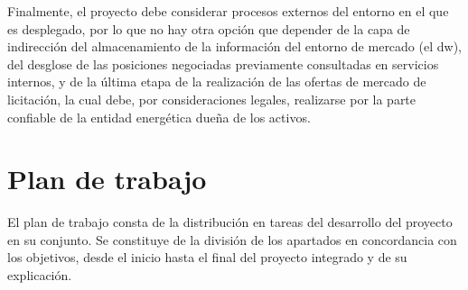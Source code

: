 Finalmente, el proyecto debe considerar procesos externos del entorno en el que es desplegado, por lo que no hay otra opción que depender de la capa de indirección del almacenamiento de la información del entorno de mercado (el \gls{dw}), del desglose de las posiciones negociadas previamente consultadas en servicios internos, y de la última etapa de la realización de las ofertas de mercado de licitación, la cual debe, por consideraciones legales, realizarse por la parte confiable de la entidad energética dueña de los activos.

\section{Plan de trabajo}%
\label{makereference1.3}

El plan de trabajo consta de la distribución en tareas del desarrollo del proyecto en su conjunto. Se constituye de la división de los apartados en concordancia con los objetivos, desde el inicio hasta el final del proyecto integrado y de su explicación.

